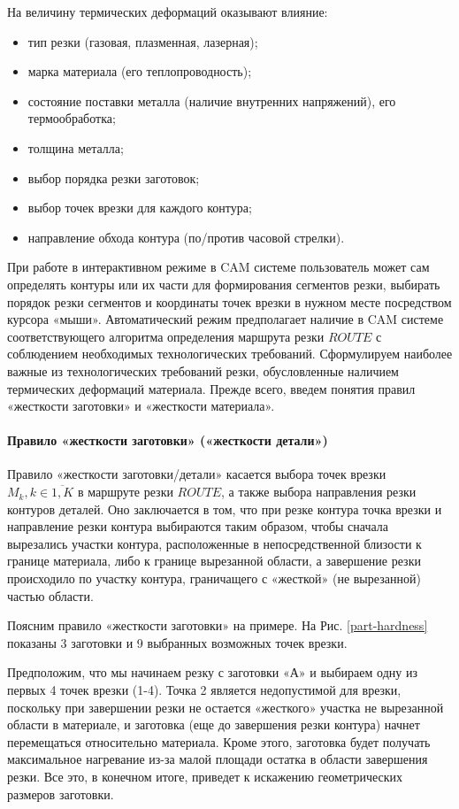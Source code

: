 \documentclass{article}
\begin{document}
На величину термических деформаций оказывают влияние:
\begin{itemize}
\item	тип резки (газовая, плазменная, лазерная);
\item	марка материала (его теплопроводность);
\item	состояние поставки металла (наличие внутренних напряжений), его термообработка;
\item	толщина металла;
\item	выбор порядка резки заготовок;
\item	выбор точек врезки для каждого контура;
\item	направление обхода контура (по/против часовой стрелки).
\end{itemize}

При работе в интерактивном режиме в CAM системе
пользователь может сам определять контуры или их части
для формирования сегментов резки,
выбирать порядок резки сегментов и координаты точек врезки
в нужном месте посредством курсора «мыши».
Автоматический режим предполагает наличие в CAM системе
соответствующего алгоритма определения маршрута резки $ROUTE$
с соблюдением необходимых технологических требований.
Сформулируем наиболее важные из технологических требований резки,
обусловленные наличием термических деформаций материала.
Прежде всего, введем понятия правил «жесткости заготовки» и «жесткости материала».

\paragraph{Правило «жесткости заготовки» («жесткости детали»)}

Правило «жесткости заготовки/детали» касается выбора точек врезки
$M_k, k \in \overline{1,K}$
в маршруте резки  $ROUTE$,
а также выбора направления резки контуров деталей.
Оно заключается в том, что при резке контура точка
врезки и направление резки контура выбираются таким образом,
чтобы сначала вырезались участки контура,
расположенные в непосредственной близости к границе материала,
либо к границе вырезанной области,
а завершение резки происходило по участку контура,
граничащего с «жесткой» (не вырезанной) частью области.

Поясним правило «жесткости заготовки» на примере.
На Рис. \ref{part-hardness}
показаны 3 заготовки и 9 выбранных возможных точек врезки.

Предположим, что мы начинаем резку с заготовки «А»
и выбираем одну из первых 4 точек врезки (1-4).
Точка 2 является недопустимой для врезки,
поскольку при завершении резки не остается
«жесткого» участка не вырезанной области в материале,
и заготовка (еще до завершения резки контура)
начнет перемещаться относительно материала.
Кроме этого, заготовка будет получать максимальное
нагревание из-за малой площади остатка в области завершения резки.
Все это, в конечном итоге,
приведет к искажению геометрических размеров заготовки.
\end{document}
